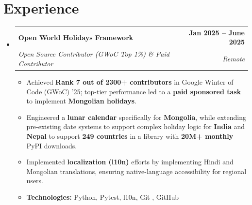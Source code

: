 \documentclass[letterpaper,11pt]{article}
\makeatletter
\newcommand{\resumeItem}[1]{
  \item\small{
    {#1 \vspace{-3pt}}
  }
}
\newcommand{\resumeSubheading}[4]{
  \vspace{-2pt}\item
    \begin{tabular*}{1.0\textwidth}[t]{l@{\extracolsep{\fill}}r}
      \vspace{-2pt}\textbf{#1} & \textbf{\small #2} \\
      \textit{\small#3} & \textit{\small #4} \\
    \end{tabular*}\vspace{-8pt}
} %
\newcommand{\resumeSubHeadingListStart}{\begin{itemize}[leftmargin=0.0in, label={}]}
\newcommand{\resumeSubHeadingListEnd}{\end{itemize}}
\newcommand{\resumeItemListStart}{\begin{itemize}}
\newcommand{\resumeItemListEnd}{\end{itemize}\vspace{-9pt}}
\makeatother
\begin{document}
\section{Experience}
\resumeSubHeadingListStart
    \resumeSubheading
    {Open World Holidays Framework}{Jan 2025 -- June 2025}
    {Open Source Contributor (GWoC Top 1\%) \& Paid Contributor}{Remote}
    \resumeItemListStart
        \resumeItem{Achieved \textbf{Rank 7 out of 2300+ contributors} in Google Winter of Code (GWoC) '25; top-tier performance led to a \textbf{paid sponsored task} to implement \textbf{Mongolian holidays}.}
        \resumeItem{Engineered a \textbf{lunar calendar} specifically for \textbf{Mongolia}, while extending pre-existing date systems to support complex holiday logic for \textbf{India} and \textbf{Nepal} to support \textbf{249 countries} in a library with \textbf{20M+ monthly} PyPI downloads.}
        \resumeItem{Implemented \textbf{localization (l10n)} efforts by implementing Hindi and Mongolian translations, ensuring native-language accessibility for regional users.}
        \resumeItem{\textbf{Technologies:} Python, Pytest, l10n, Git , GitHub}
    \resumeItemListEnd
\resumeSubHeadingListEnd
\vspace{-15pt}



\end{document}
